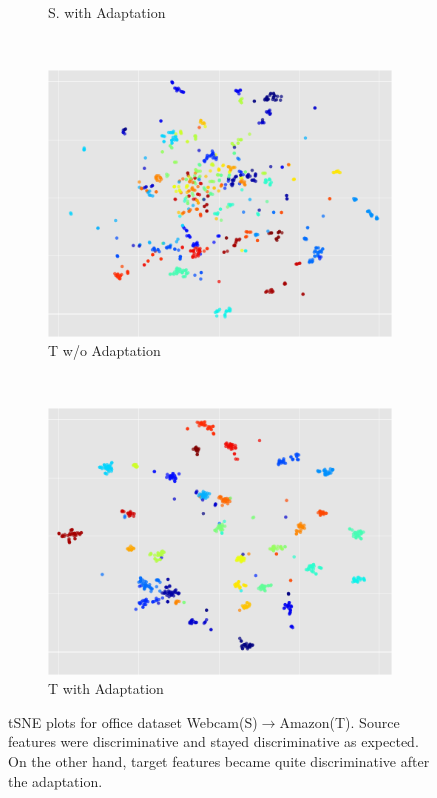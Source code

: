 \begin{figure}[ht]
\begin{subfigure}[t]{0.25\textwidth}
        \caption{S. with Adaptation}
    \end{subfigure}~\begin{subfigure}[t]{0.25\textwidth}
        \includegraphics[width=\textwidth]{before_c_t_c}
        \caption{T w/o Adaptation}
        \label{fig:gull}
    \end{subfigure}~\begin{subfigure}[t]{0.25\textwidth}
        \includegraphics[width=\textwidth]{after_c_t_c}
        \caption{T with Adaptation}
    \end{subfigure}
    \caption{tSNE plots for office dataset Webcam(S)$\rightarrow$Amazon(T). Source features were discriminative and stayed discriminative as expected. On the other hand, target features became quite discriminative after the adaptation.}

\end{figure}
